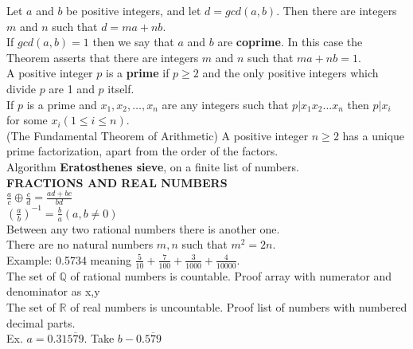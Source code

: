 \documentclass[10pt,landscape]{article}
\begin{document}
\begin{multicols}{4}
Let $a$ and $b$ be positive integers, and let $d = gcd(a,b)$. Then
there are integers $m$ and $n$ such that $d = ma + nb$.\\

If $gcd(a,b) = 1$ then we say that $a$ and $b$ are
\textbf{coprime}. In this case the Theorem asserts that there are
integers $m$ and $n$ such that $ma + nb = 1$.\\

A positive integer $p$ is a \textbf{prime} if $p \geq 2$ and the only
positive integers which divide $p$ are 1 and $p$ itself.\\

If $p$ is a prime and $x_1, x_2, \dotsc ,x_n$ are any integers such
that $p|x_1 x_2 \dots x_n$ then $p|x_i$ for some $x_i(1 \leq i \leq
n)$.\\

(The Fundamental Theorem of Arithmetic) A positive integer $n \geq 2$
has a unique prime factorization, apart from the order of the
factors.\\

Algorithm \textbf{Eratosthenes sieve}, on a finite list of numbers.\\



\textbf{FRACTIONS AND REAL NUMBERS}\\
$\frac{a}{c} \oplus \frac{c}{d} = \frac{ad + bc}{bd}$\\

$\left( \frac{a}{b} \right)^{-1} = \frac{b}{a} (a,b \neq 0)$\\

Between any two rational numbers there is another one.\\

There are no natural numbers $m, n$ such that $m^2 =2n$.\\

Example: 0.5734 meaning $\frac{5}{10} + \frac{7}{100} + \frac{3}{1000}
+ \frac {4}{10000}$.\\

The set of $\mathbb{Q}$ of rational numbers is countable. Proof array
with numerator and denominator as x,y\\

The set of $\mathbb{R}$ of real numbers is uncountable. Proof list of
numbers with numbered decimal parts.\\

Ex. $a = 0.31\overline{579}$. Take $b-0.\overline{579}$\\


\end{multicols}
\end{document}
